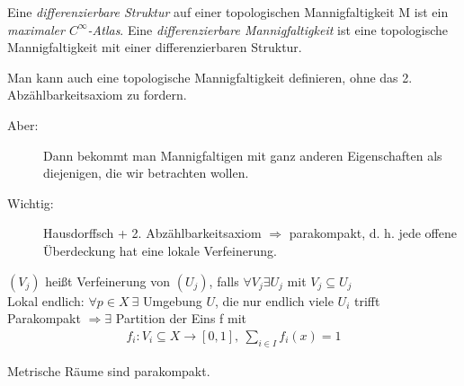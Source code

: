 \begin{defs}
Eine \textit{differenzierbare Struktur} auf einer topologischen Mannigfaltigkeit M ist ein \textit{maximaler $C^\infty$-Atlas}. Eine \textit{differenzierbare Mannigfaltigkeit} ist eine topologische Mannigfaltigkeit mit einer differenzierbaren Struktur.
\end{defs}

\begin{bem}
Man kann auch eine topologische Mannigfaltigkeit definieren, ohne das 2. Abzählbarkeitsaxiom zu fordern.
\begin{description}
\item[Aber:] Dann bekommt man Mannigfaltigen mit ganz anderen Eigenschaften als diejenigen, die wir betrachten wollen.
\item[Wichtig:] Hausdorffsch + 2. Abzählbarkeitsaxiom $\Rightarrow$ parakompakt, d. h. jede offene Überdeckung hat eine lokale Verfeinerung.
\end{description}
$(V_j)$ heißt Verfeinerung von $(U_j)$, falls $\forall V_j \exists U_j$ mit $V_j \subseteq U_j$\\
Lokal endlich: $\forall p \in X\ \exists$ Umgebung $U$, die nur endlich viele $U_i$ trifft\\
Parakompakt $\Rightarrow \exists$ Partition der Eins f mit 
\begin{align*}
f_i: V_i \subseteq X \rightarrow [0, 1],\ \sum_{i \in I} f_i (x) = 1
\end{align*} 
\end{bem}

\begin{bsp}
Metrische Räume sind parakompakt.
\end{bsp}

